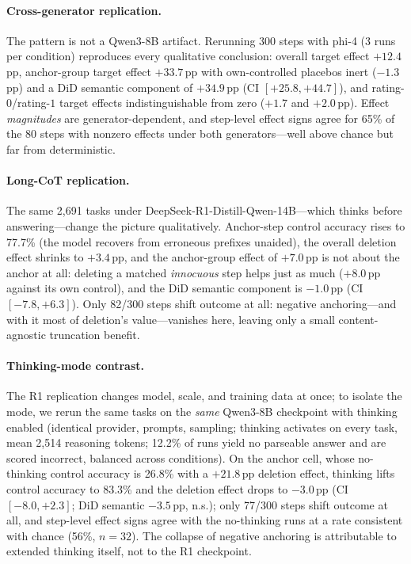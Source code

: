 \documentclass[11pt]{article}
\newcommand{\ci}[2]{[#1, #2]}
\begin{document}
\paragraph{Cross-generator replication.}
The pattern is not a Qwen3-8B artifact. Rerunning 300 steps with phi-4 (3 runs per condition) reproduces every qualitative conclusion: overall target effect $+12.4$\,pp, anchor-group target effect $+33.7$\,pp with own-controlled placebos inert ($-1.3$\,pp) and a DiD semantic component of $+34.9$\,pp (CI $\ci{+25.8}{+44.7}$), and rating-$0$/rating-$1$ target effects indistinguishable from zero ($+1.7$ and $+2.0$\,pp). Effect \emph{magnitudes} are generator-dependent, and step-level effect signs agree for 65\% of the 80 steps with nonzero effects under both generators---well above chance but far from deterministic.

\paragraph{Long-CoT replication.}
The same 2{,}691 tasks under DeepSeek-R1-Distill-Qwen-14B---which thinks before answering---change the picture qualitatively. Anchor-step control accuracy rises to 77.7\% (the model recovers from erroneous prefixes unaided), the overall deletion effect shrinks to $+3.4$\,pp, and the anchor-group effect of $+7.0$\,pp is not about the anchor at all: deleting a matched \emph{innocuous} step helps just as much ($+8.0$\,pp against its own control), and the DiD semantic component is $-1.0$\,pp (CI $\ci{-7.8}{+6.3}$). Only 82/300 steps shift outcome at all: negative anchoring---and with it most of deletion's value---vanishes here, leaving only a small content-agnostic truncation benefit.

\paragraph{Thinking-mode contrast.}
The R1 replication changes model, scale, and training data at once; to isolate the mode, we rerun the same tasks on the \emph{same} Qwen3-8B checkpoint with thinking enabled (identical provider, prompts, sampling; thinking activates on every task, mean 2{,}514 reasoning tokens; 12.2\% of runs yield no parseable answer and are scored incorrect, balanced across conditions). On the anchor cell, whose no-thinking control accuracy is 26.8\% with a $+21.8$\,pp deletion effect, thinking lifts control accuracy to 83.3\% and the deletion effect drops to $-3.0$\,pp (CI $\ci{-8.0}{+2.3}$; DiD semantic $-3.5$\,pp, n.s.); only 77/300 steps shift outcome at all, and step-level effect signs agree with the no-thinking runs at a rate consistent with chance (56\%, $n{=}32$). The collapse of negative anchoring is attributable to extended thinking itself, not to the R1 checkpoint.
\end{document}
